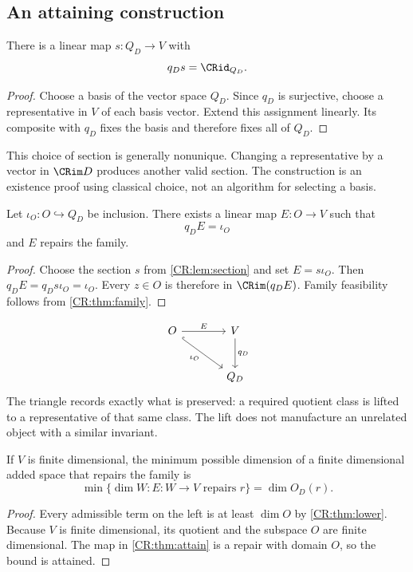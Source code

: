 \subsection{An attaining construction}
\begin{CRlemma}\label{CR:lem:section}
There is a linear map $s:Q_D\to V$ with
\[
q_Ds=\CRid_{Q_D}.
\]
\end{CRlemma}
\begin{proof}
Choose a basis of the vector space $Q_D$. Since $q_D$ is surjective, choose a representative in $V$ of each basis vector. Extend this assignment linearly. Its composite with $q_D$ fixes the basis and therefore fixes all of $Q_D$.
\end{proof}

This choice of section is generally nonunique. Changing a representative by a vector in $\CRim D$ produces another valid section. The construction is an existence proof using classical choice, not an algorithm for selecting a basis.

\begin{CRtheorem}\label{CR:thm:attain}
Let $\iota_O:O\hookrightarrow Q_D$ be inclusion. There exists a linear map $E:O\to V$ such that
\begin{equation}\label{CR:eq:section-on-O}
q_DE=\iota_O
\end{equation}
and $E$ repairs the family.
\end{CRtheorem}
\begin{proof}
Choose the section $s$ from \cref{CR:lem:section} and set $E=s\iota_O$. Then $q_DE=q_Ds\iota_O=\iota_O$. Every $z\in O$ is therefore in $\CRim(q_DE)$. Family feasibility follows from \cref{CR:thm:family}.
\end{proof}

\[
\begin{tikzcd}[column sep=large,row sep=large]
O \arrow[r,"E"] \arrow[dr,hook,"\iota_O"'] & V \arrow[d,"q_D"]\\
& Q_D
\end{tikzcd}
\]
The triangle records exactly what is preserved: a required quotient class is lifted to a representative of that same class. The lift does not manufacture an unrelated object with a similar invariant.

\begin{CRtheorem}\label{CR:thm:minimum}
If $V$ is finite dimensional, the minimum possible dimension of a finite dimensional added space that repairs the family is
\begin{equation}\label{CR:eq:minimum}
\min\bigl\{\dim W: E:W\to V\text{ repairs }r\bigr\}=\dim O_D(r).
\end{equation}
\end{CRtheorem}
\begin{proof}
Every admissible term on the left is at least $\dim O$ by \cref{CR:thm:lower}. Because $V$ is finite dimensional, its quotient and the subspace $O$ are finite dimensional. The map in \cref{CR:thm:attain} is a repair with domain $O$, so the bound is attained.
\end{proof}

